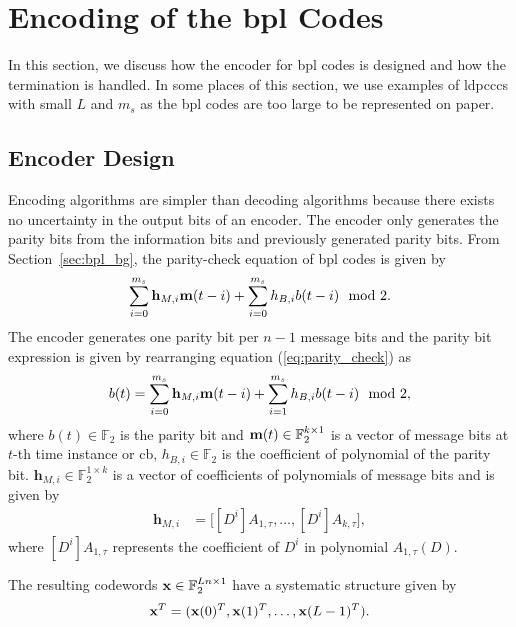 \section{Encoding of the \acl{bpl} Codes}\label{sec:encode}
In this section, we discuss how the encoder for \ac{bpl} codes is designed and how the termination is handled. In some places of this section, we use examples of \acp{ldpccc} with small $L$ and $m_s$ as the \ac{bpl} codes are too large to be represented on paper.

\subsection{Encoder Design}\label{sec:enc_design}
Encoding algorithms are simpler than decoding algorithms because there exists no uncertainty in the output bits of an encoder. The encoder only generates the parity bits from the information bits and previously generated parity bits. From Section~\ref{sec:bpl_bg}, the parity-check equation of \ac{bpl} codes is given by
\begin{align}\label{eq:parity_check}
\sum_{i=0}^{m_s}\mathbf{h}_{M,i}\mathbf{m}(t-i)+\sum_{i=0}^{m_s}h_{B,i}b(t-i) \mod 2.
\end{align}
The encoder generates one parity bit per $n-1$ message bits and the parity bit expression is given by rearranging equation (\ref{eq:parity_check}) as
\begin{align}\label{eq:parity_bit}
b(t)=\sum_{i=0}^{m_s}\mathbf{h}_{M,i}\mathbf{m}(t-i)+\sum_{i=1}^{m_s}h_{B,i}b(t-i) \mod 2,
\end{align}
where $b(t)\in\mathbb{F}_2$ is the parity bit and $\mathbf{m}(t)\in\mathbb{F}_2^{k\times 1}$ is a vector of message bits at $t$-th time instance or \ac{cb}, $h_{B,i}\in\mathbb{F}_2$ is the coefficient of polynomial of the parity bit. $\mathbf{h}_{M,i}\in\mathbb{F}_2^{1\times k}$ is a vector of coefficients of polynomials of message bits and is given by
\begin{align}
\mathbf{h}_{M,i}&= \big[[D^i]A_{1,\tau},\dots,[D^i]A_{k,\tau}\big],
\end{align}
where $[D^i]A_{1,\tau}$ represents the coefficient of $D^i$ in polynomial $A_{1,\tau}(D)$.

The resulting codewords $\mathbf{x}\in\mathbb{F}_2^{Ln\times 1}$ have a systematic structure given by \begin{align}\mathbf{x}^T=(\mathbf{x}(0)^T,\mathbf{x}(1)^T,\dots,\mathbf{x}(L-1)^T).\end{align}

